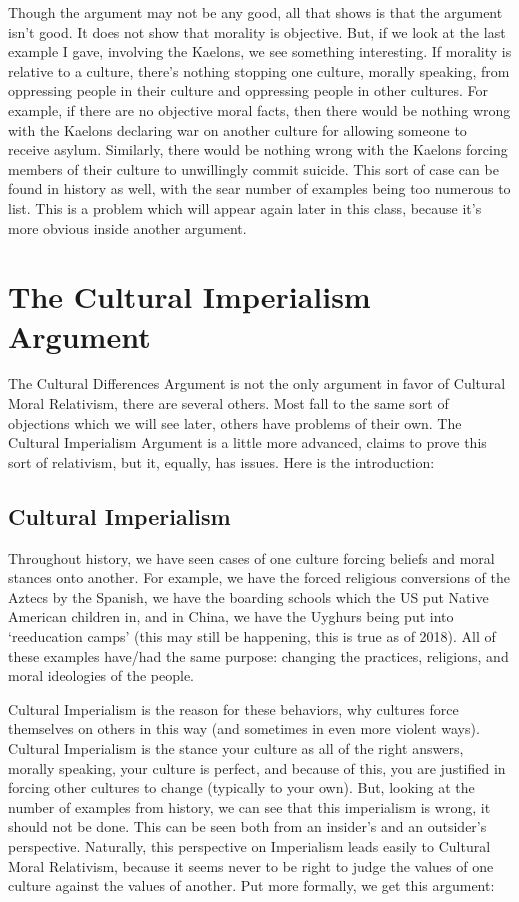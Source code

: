Though the argument may not be any good, all that shows is that the argument isn't good. It does not show that morality is objective. But, if we look at the last example I gave, involving the Kaelons, we see something interesting. If morality is relative to a culture, there's nothing stopping one culture, morally speaking, from oppressing people in their culture and oppressing people in other cultures. For example, if there are no objective moral facts, then there would be nothing wrong with the Kaelons declaring war on another culture for allowing someone to receive asylum. Similarly, there would be nothing wrong with the Kaelons forcing members of their culture to unwillingly commit suicide. This sort of case can be found in history as well, with the sear number of examples being too numerous to list. This is a problem which will appear again later in this class, because it's more obvious inside another argument.  

\section{The Cultural Imperialism Argument}

The Cultural Differences Argument is not the only argument in favor of Cultural Moral Relativism, there are several others. Most fall to the same sort of objections which we will see later, others have problems of their own. The Cultural Imperialism Argument is a little more advanced, claims to prove this sort of relativism, but it, equally, has issues.  Here is the introduction:

\subsection{Cultural Imperialism}

Throughout history, we have seen cases of one culture forcing beliefs and moral stances onto another. For example, we have the forced religious conversions of the Aztecs by the Spanish, we have the boarding schools which the US put Native American children in, and in China, we have the Uyghurs being put into `reeducation camps' (this may still be happening, this is true as of 2018). All of these examples have/had the same purpose: changing the practices, religions, and moral ideologies of the people.  

Cultural Imperialism is the reason for these behaviors, why cultures force themselves on others in this way (and sometimes in even more violent ways). Cultural Imperialism is the stance your culture as all of the right answers, morally speaking, your culture is perfect, and because of this, you are justified in forcing other cultures to change (typically to your own). But, looking at the number of examples from history, we can see that this imperialism is wrong, it should not be done. This can be seen both from an insider's and an outsider's perspective. Naturally, this perspective on Imperialism leads easily to Cultural Moral Relativism, because it seems never to be right to judge the values of one culture against the values of another. Put more formally, we get this argument:

